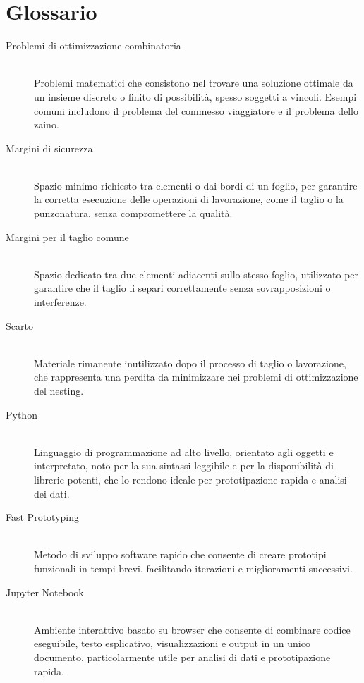 \cleardoublepage
\chapter{Glossario}

\begin{description}
    \item[Problemi di ottimizzazione combinatoria] \hfill \\
    Problemi matematici che consistono nel trovare una soluzione ottimale da un insieme discreto o finito di possibilità, spesso soggetti a vincoli. Esempi comuni includono il problema del commesso viaggiatore e il problema dello zaino.

    \item[Margini di sicurezza] \hfill \\
    Spazio minimo richiesto tra elementi o dai bordi di un foglio, per garantire la corretta esecuzione delle operazioni di lavorazione, come il taglio o la punzonatura, senza compromettere la qualità.

    \item[Margini per il taglio comune] \hfill \\
    Spazio dedicato tra due elementi adiacenti sullo stesso foglio, utilizzato per garantire che il taglio li separi correttamente senza sovrapposizioni o interferenze.

    \item[Scarto] \hfill \\
    Materiale rimanente inutilizzato dopo il processo di taglio o lavorazione, che rappresenta una perdita da minimizzare nei problemi di ottimizzazione del nesting.

    \item[Python] \hfill \\
    Linguaggio di programmazione ad alto livello, orientato agli oggetti e interpretato, noto per la sua sintassi leggibile e per la disponibilità di librerie potenti, che lo rendono ideale per prototipazione rapida e analisi dei dati.

    \item[Fast Prototyping] \hfill \\
    Metodo di sviluppo software rapido che consente di creare prototipi funzionali in tempi brevi, facilitando iterazioni e miglioramenti successivi.

    \item[Jupyter Notebook] \hfil \\
    Ambiente interattivo basato su browser che consente di combinare codice eseguibile, testo esplicativo, visualizzazioni e output in un unico documento, particolarmente utile per analisi di dati e prototipazione rapida.


\end{description}
